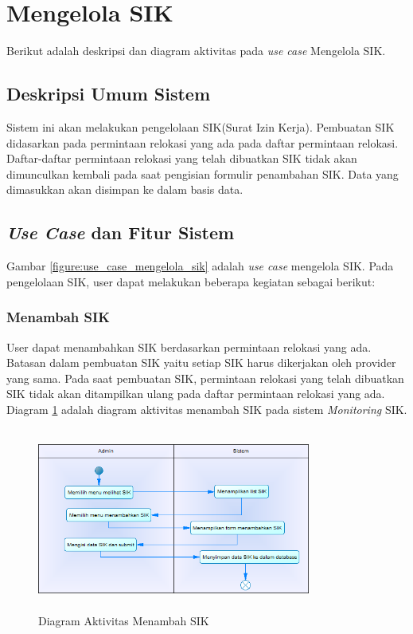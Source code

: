 \section{Mengelola SIK}
Berikut adalah deskripsi dan diagram aktivitas pada \textit{use case} Mengelola SIK.
\subsection{Deskripsi Umum Sistem}
\tab Sistem ini akan melakukan pengelolaan SIK(Surat Izin Kerja). Pembuatan SIK didasarkan pada permintaan relokasi yang ada pada daftar permintaan relokasi. Daftar-daftar permintaan relokasi yang telah dibuatkan SIK tidak akan dimunculkan kembali pada saat pengisian formulir penambahan SIK. Data yang dimasukkan akan disimpan ke dalam basis data.
\subsection{\textit{Use Case} dan Fitur Sistem}
Gambar \ref{figure:use_case_mengelola_sik} adalah \textit{use case} mengelola SIK. Pada pengelolaan SIK, user dapat melakukan beberapa kegiatan sebagai berikut:
	\subsubsection{Menambah SIK}
	User dapat menambahkan SIK berdasarkan permintaan relokasi yang ada. Batasan dalam pembuatan SIK yaitu setiap SIK harus dikerjakan oleh provider yang sama. Pada saat pembuatan SIK, permintaan relokasi yang telah dibuatkan SIK tidak akan ditampilkan ulang pada daftar permintaan relokasi yang ada. Diagram \ref{figure:activity_menambah_sik} adalah diagram aktivitas menambah SIK pada sistem \textit{Monitoring} SIK.
	\begin{figure}[h]
	\centerline {\includegraphics[width=9cm,height=6cm]{bab4/ActivityDiagram_MenambahkanSIK.png}}
	\caption{Diagram Aktivitas Menambah SIK}
	\label{figure:activity_menambah_sik}
	\end{figure}
		
